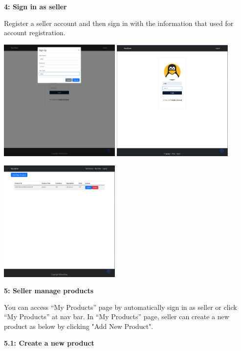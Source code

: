 \documentclass[12pt]{article}
\begin{document}
\newpage
\textbf{4: Sign in as seller}

Register a seller account and then sign in with the information that used for account registration.

\includegraphics[width=0.45\textwidth]{UserGuideImage/6.png}
\includegraphics[width=0.45\textwidth]{UserGuideImage/7.png}


\includegraphics[width=0.45\textwidth]{UserGuideImage/8.png}

\newpage
\textbf{5: Seller manage products}

You can access “My Products” page by automatically sign in as seller or click “My Products”
at nav bar. In “My Products” page, seller can create a new product as below by clicking "Add New Product".

\vspace*{5mm}
\hspace*{5mm}\textbf{5.1: Create a new product}
\end{document}
